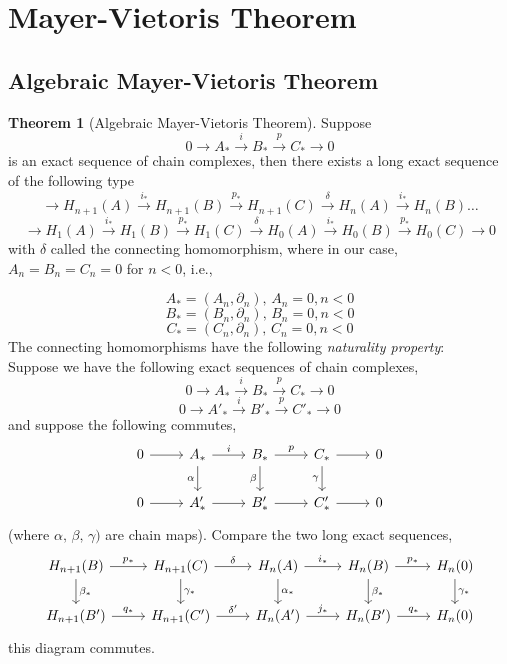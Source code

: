 \documentclass[a4paper,14pt]{extarticle}
\theoremstyle{definition}
\newtheorem*{theorem}{Theorem}
\begin{document}
\section{Mayer-Vietoris Theorem}
\subsection{Algebraic Mayer-Vietoris Theorem}
\begin{theorem}[Algebraic Mayer-Vietoris Theorem]
	Suppose 
\[0\rightarrow A_*\xrightarrow{i} B_*\xrightarrow{p} C_*\rightarrow 0\]
is an exact sequence of chain complexes, then there exists a long exact
sequence of the following type
\[\rightarrow H_{n+1}(A)\xrightarrow{i_*} H_{n+1}(B)\xrightarrow{p_*} H_{n+1}(C)
\xrightarrow{\delta} H_n(A)\xrightarrow{i_*}H_n(B)\ldots\]
\[\rightarrow H_1(A)\xrightarrow{i_*}H_1(B)\xrightarrow{p_*}H_1(C)\xrightarrow{\delta}
H_0(A)\xrightarrow{i_*}H_0(B)\xrightarrow{p_*}H_0(C)\rightarrow 0\]
with $\delta$ called the connecting homomorphism,
where in our case, $A_n=B_n=C_n=0$ for $n<0$, i.e.,

 
\[A_*=(A_n,\partial_n), \,A_n=0,n<0\]
\[B_*=(B_n,\partial_n), \,B_n=0,n<0\]
\[C_*=(C_n,\partial_n), \,C_n=0,n<0\]
The connecting homomorphisms have the following \emph{naturality property}: \\

\noindent\vspace{12pt}
Suppose we have the following exact sequences of chain complexes,
\[0\rightarrow A_*\xrightarrow{i} B_*\xrightarrow{p} C_*\rightarrow 0\]
\[0\rightarrow A'_*\xrightarrow{i} B'_*\xrightarrow{p} C'_*\rightarrow 0\]
and suppose the following commutes,
\[
\begin{tikzcd}
	0 \arrow{r} & A_* \arrow{r}{i} \arrow[swap]{d}{\alpha} & B_* \arrow{r}{p}
	\arrow{d}[swap]{\beta} & C_* \arrow{r} \arrow[swap]{d}{\gamma} & 0 \\
	0 \arrow{r} & A'_* \arrow{r} & B'_* \arrow{r} & C'_* \arrow{r} & 0
\end{tikzcd}
\]
(where $\alpha, \,\beta, \,\gamma)$ are chain maps).
Compare the two long exact sequences,
\[
\begin{tikzcd}
	H_{n+1}(B) \arrow{r}{p_*} \arrow{d}{\beta_*} & H_{n+1}(C) \arrow{r}{\delta}
	\arrow{d}{\gamma_*} & H_n(A) \arrow{r}{i_*}
	\arrow{d}{\alpha_*} & H_n(B) \arrow{r}{p_*} \arrow{d}{\beta_*} & 
	H_n(0) \arrow{d}{\gamma_*} \\
	H_{n+1}(B') \arrow{r}{q_*} & H_{n+1}(C') \arrow{r}{\delta'} &
	H_n(A') \arrow{r}{j_*} & H_n(B') \arrow{r}{q_*} & H_n(0)
\end{tikzcd}
\]
this diagram commutes. 
\end{theorem}
\end{document}
